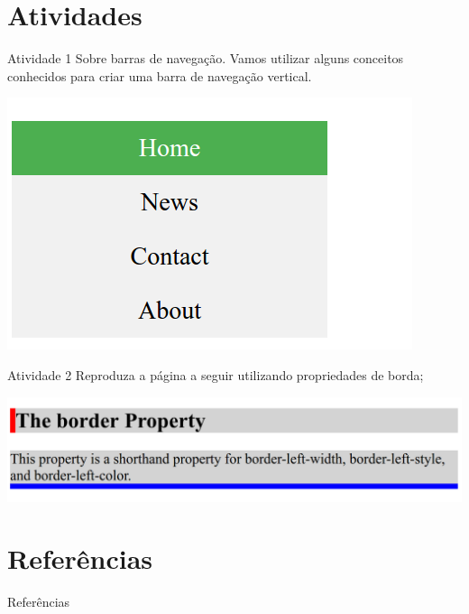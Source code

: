 \documentclass{beamer}
\begin{document}
\section{Atividades}
\begin{frame}{Atividade 1}
Sobre barras de navegação. Vamos utilizar alguns conceitos conhecidos para criar uma barra de navegação 
vertical.
	\begin{center}
		  \includegraphics[height=0.4\paperheight]{fig/aula2/aep_1_2.png} \\
	  \end{center}
\end{frame}
\begin{frame}{Atividade 2}
Reproduza a página a seguir utilizando propriedades de borda;
  \begin{center}
    \includegraphics[height=0.2\paperheight]{fig/aula2/AEP_1_1.png} \\
  \end{center}
\end{frame}




\section{Referências}

\begin{frame}{Referências}%
\small
\begin{center}
\tiny


\end{center}
\end{frame}
\end{document}
